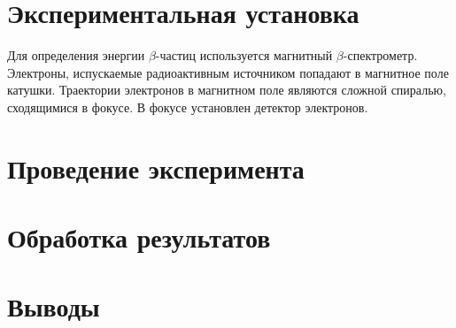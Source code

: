 \documentclass[14pt, a4paper]{report}
\begin{document}
\section{Экспериментальная установка}

Для определения энергии $\beta$-частиц используется магнитный $\beta$-спектрометр. Электроны, испускаемые радиоактивным источником попадают в магнитное поле катушки. Траектории электронов в магнитном поле являются сложной спиралью, сходящимися в фокусе. В фокусе установлен детектор электронов.

\section{Проведение эксперимента}

\section{Обработка результатов}

\section{Выводы}
\end{document}
